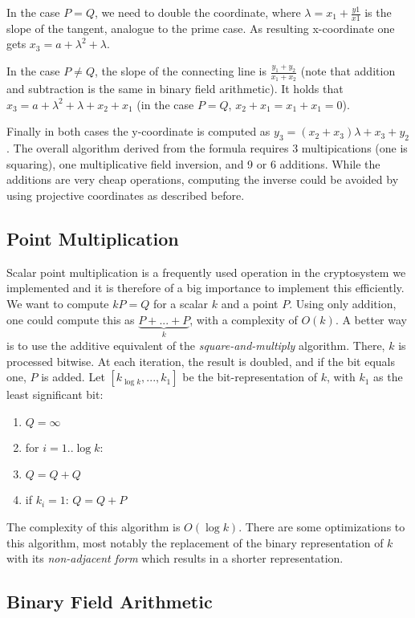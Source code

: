 \documentclass[11pt,english]{article}
\begin{document}
In the case $P=Q$, we need to double the coordinate, where $\lambda=x_1+\frac{y1}{x1}$ is the slope of the tangent, analogue to the prime case. As resulting x-coordinate one gets $x_3=a+\lambda^2+\lambda$.

In the case $P\ne Q$, the slope of the connecting line is $\frac{y_1+y_2}{x_1+x_2}$ (note that addition and subtraction is the same in binary field arithmetic). It holds that $x_3=a+\lambda^2+\lambda+x_2+x_1$ (in the case $P=Q$, $x_2+x_1=x_1+x_1=0$).

Finally in both cases the y-coordinate is computed as $y_3=(x_2+x_3)\lambda+x_3+y_2$. The overall algorithm derived from the formula requires 3 multipications (one is squaring), one multiplicative field inversion, and 9 or 6 additions. While the additions are very cheap operations, computing the inverse could be avoided by using projective coordinates as described before.

\subsection{Point Multiplication}
Scalar point multiplication is a frequently used operation in the cryptosystem we implemented and it is therefore of a big importance to implement this efficiently. We want to compute $kP=Q$ for a scalar $k$ and a point $P$. Using only addition, one could compute this as $\underbrace{P+...+P}_{k}$, with a complexity of $O(k)$. A better way is to use the additive equivalent of the \emph{square-and-multiply} algorithm. There, $k$ is processed bitwise. At each iteration, the result is doubled, and if the bit equals one, $P$ is added. Let $[k_{\log{k}},...,k_1]$ be the bit-representation of $k$, with $k_1$ as the least significant bit:

\begin{enumerate}
 \item $Q=\infty$
 \item for $i=1..\log{k}$:
 \item $Q=Q+Q$
 \item if $k_i=1$: $Q=Q+P$
\end{enumerate}

The complexity of this algorithm is $O(\log{k})$. There are some optimizations to this algorithm, most notably the replacement of the binary representation of $k$ with its \emph{non-adjacent form} which results in a shorter representation. 

\subsection{Binary Field Arithmetic}
\end{document}
